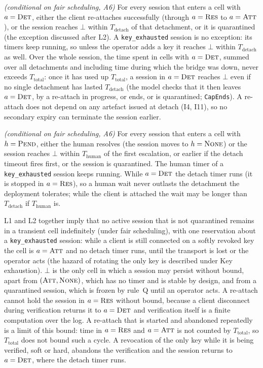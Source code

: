\begin{description}[leftmargin=2em]
\item[L1.] \emph{(conditional on fair scheduling, A6)} For every
session that enters a cell with $a=\textsc{Det}$, either the client
re-attaches successfully (through $a=\textsc{Res}$ to
$a=\textsc{Att}$), or the session reaches $\bot$ within
$T_{\text{detach}}$ of that detachment, or it is quarantined (the exception
discussed after L2). A \texttt{key\_exhausted} session is no exception: its
timers keep running, so unless the operator adds a key it reaches $\bot$
within $T_{\text{detach}}$ as well. Over the whole session, the time
spent in cells with $a=\textsc{Det}$, summed over all detachments and
including time during which the bridge was down, never exceeds
$T_{\text{total}}$: once it has used up $T_{\text{total}}$, a session in
$a=\textsc{Det}$ reaches $\bot$ even if no single detachment has lasted
$T_{\text{detach}}$ (the model checks that it then leaves $a=\textsc{Det}$,
by a re-attach in progress, or ends, or is quarantined; \texttt{CapEnds}).
A re-attach does not depend on any artefact issued
at detach (I4, I11), so no secondary expiry can terminate the session
earlier.
\item[L2.] \emph{(conditional on fair scheduling, A6)} For every session
that enters a cell with $h=\textsc{Pend}$, either the human resolves
(the session moves to $h=\textsc{None}$) or the session reaches
$\bot$ within $T_{\text{human}}$ of the first escalation, or earlier if
the detach timeout fires first, or the session is quarantined. The
human timer of a \texttt{key\_exhausted} session keeps running. While $a=\textsc{Det}$ the detach
timer runs (it is stopped in $a=\textsc{Res}$), so a human wait never outlasts the detachment the deployment
tolerates; while the client is attached the wait may be longer than
$T_{\text{detach}}$ if $T_{\text{human}}$ is.
\end{description}

L1 and L2 together imply that no active session that is not quarantined
remains in a transient cell indefinitely (under fair scheduling), with one
reservation about a \texttt{key\_exhausted} session: while a client is
still connected on a softly revoked key the cell is $a=\textsc{Att}$ and no
detach timer runs, until the transport is lost or the operator acts (the
hazard of rotating the only key is described under Key exhaustion).
$\bot$ is the only
cell in which a session may persist without bound, apart from
$(\textsc{Att},\textsc{None})$, which has no timer and is stable by design,
and from a quarantined session, which is frozen by rule~Q until an operator
acts. A re-attach
cannot hold the session in $a=\textsc{Res}$ without bound, because a
client disconnect during verification returns it to $a=\textsc{Det}$ and
verification itself is a finite computation over the log. A re-attach that
is started and abandoned repeatedly is a limit of this bound: time in
$a=\textsc{Res}$ and $a=\textsc{Att}$ is not counted by $T_{\text{total}}$,
so $T_{\text{total}}$ does not bound such a cycle. A revocation of the only key while it is being
verified, soft or hard, abandons the verification and the session returns
to $a=\textsc{Det}$, where the detach timer runs.

